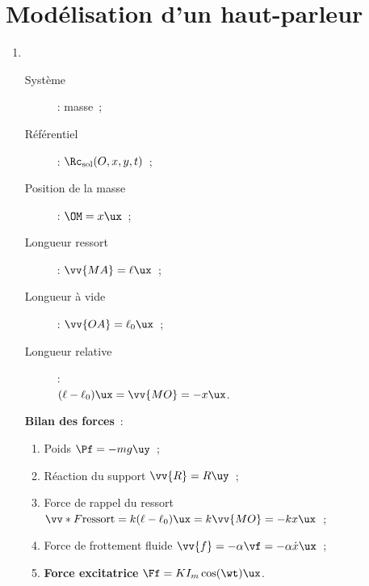 \documentclass[a4paper, 12pt, final, garamond]{book}
\begin{document}
\section{Modélisation d'un haut-parleur}
\begin{enumerate}
    \item ~

        \vspace{-18pt}
        \begin{minipage}{0.43\linewidth}
            \begin{description}
                \item[Système] : masse~;
                \item[Référentiel] : $\Rc_{\rm sol} (O,x,y,t)$~;
                \item[Position de la masse] : $\OM = x\ux$~;
                \item[Longueur ressort] : $\vv{MA} = \ell\ux$~;
                \item[Longueur à vide] : $\vv{OA} = \ell_0\ux$~;
                \item[Longueur relative] :\\
                    $(\ell - \ell_0)\ux = \vv{MO} = -x\ux$.
            \end{description}
        \end{minipage}
        \hfill
        \begin{minipage}{0.57\linewidth}
            \textbf{Bilan des forces}~:
            \begin{enumerate}
                \item Poids $\Pf = -mg\uy$~;
                \item Réaction du support $\vv{R} = R\uy$~;
                \item Force de rappel du ressort\\
                    $\vv*{F}{\rm ressort} = k(\ell - \ell_0)\ux =
                    k\vv{MO} = -kx\ux$~;
                \item Force de frottement fluide $\vv{f} = -\alpha\vf =
                    -\alpha\dot{x}\ux$~;
                \item \textbf{Force excitatrice} $\Ff = KI_m\cos(\wt)\ux$.
            \end{enumerate}
        \end{minipage}


\end{enumerate}
\end{document}
